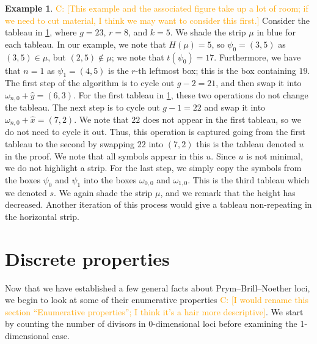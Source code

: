 \documentclass[11pt,reqno]{amsart}
\newcommand{\caelan}[1]{\textcolor{orange}{\sf C: [#1]}}
\theoremstyle{definition}
\theoremstyle{problem}
\newtheorem{example}[definition]{Example}
\theoremstyle{plain}
\theoremstyle{remark}
\theoremstyle{theorem}
\numberwithin{equation}{section}
\numberwithin{figure}{section}
\begin{document}
\begin{example}\label{ex:3}
  \caelan{This example and the associated figure take up a lot of
    room; if we need to cut material, I think we may want to consider
    this first.}  Consider the tableau in
  \cref{fig:path-connected-odd-ex}, where $g=23$, $r=8$, and $k=5$. We
  shade the strip $\mu$ in blue for each tableau. In our example, we
  note that $H(\mu)=5$, so $\psi_0=(3,5)$ as $(3,5)\in \mu$, but
  $(2,5)\notin\mu$; we note that $t(\psi_0)=17$. Furthermore, we have
  that $n=1$ as $\psi_1=(4,5)$ is the $r$-th leftmost box; this is
  the box containing $19$. The first step of
  the algorithm is to cycle out $g-2=21$, and then swap it into
  $\omega_{n,0}+\hat{y}=(6,3)$. For the first tableau in
  \cref{fig:path-connected-odd-ex}, these two operations do not change
  the tableau. The next step is to cycle out $g-1=22$ and swap it into
  $\omega_{n,0}+\hat{x}=(7,2)$. We note
  that $22$ does not appear in the first tableau, so we do not need to
  cycle it out. Thus, this operation is captured going from the first
  tableau to the second by swapping $22$ into $(7,2)$ this is
  the tableau denoted $u$ in the proof. We note that all symbols
  appear in this $u$. Since $u$ is not
  minimal, we do not highlight a strip. For the last step, we 
  simply copy the symbols from the boxes $\psi_0$ and $\psi_1$
  into the boxes $\omega_{0,0}$ and $\omega_{1,0}$. This is the third 
  tableau which we denoted $s$. We again shade the strip
  $\mu$, and we remark that the height has decreased. Another
  iteration of this process would give a tableau non-repeating in the
  horizontal strip.
  \begin{figure}[htb]
    
    \caption{}
    \label{fig:path-connected-odd-ex}
  \end{figure}
\end{example}

\section{Discrete properties}\label{sec:counting}

Now that we have established a few general facts about
Prym--Brill--Noether loci, we begin to look at some of their
enumerative properties \caelan{I would rename this section
  ``Enumerative properties''; I think it's a hair more descriptive}.
We start by counting the number of divisors in 0-dimensional loci
before examining the 1-dimensional case.
\end{document}
